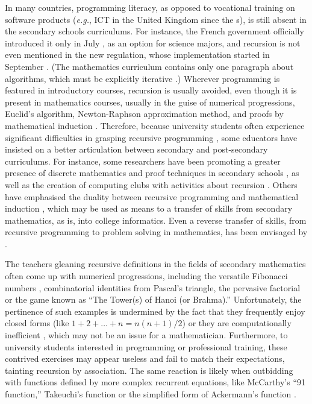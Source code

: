 \documentclass[11pt,a4paper]{article}
\begin{document}
In many countries, programming literacy, as opposed to vocational
training on software products (\emph{e.g.}, ICT in the United Kingdom
since the s), is still absent in the secondary
schools curriculums. For instance, the French government officially
introduced it only in July , as an option for
science majors, and recursion is not even mentioned in the new
regulation, whose implementation started in September
. (The mathematics curriculum contains only one
paragraph about algorithms, which must be explicitly iterative
\citep{Modeste:2012}.) Wherever programming is featured in
introductory courses, recursion is usually avoided, even though it is
present in mathematics courses, usually in the guise of numerical
progressions, Euclid's algorithm, Newton\hyp{}Raphson approximation
method, and proofs by mathematical induction
\citep{Buck:1963}. Therefore, because university students often
experience significant difficulties in grasping recursive programming
\citep{Sooriamurthi:2001,Ginat:2004}, some educators have insisted on
a better articulation between secondary and post\hyp{}secondary
curriculums. For instance, some researchers have been promoting a
greater presence of discrete mathematics and proof techniques in
secondary schools
\citep{AbramovichPieper:1996,daRosa:2002,RosensteinFranzblauRoberts:1997,ZDM:A,ZDM:B},
as well as the creation of computing clubs with activities about
recursion \citep{GunionMilfordStege:2009a}. Others have emphasised the
duality between recursive programming and mathematical induction
\citep{Peelle:1976,Ford:1984,LeronZazkis:1986,Anderson:1992,BrandtRichey:2004,Polycarpou:2006},
which may be used as means to a transfer of skills from secondary
mathematics, as is, into college informatics. Even a reverse transfer
of skills, from recursive programming to problem solving in
mathematics, has been envisaged by \textcite{Hausmann:1985}.

The teachers gleaning recursive definitions in the fields of secondary
mathematics often come up with numerical progressions, including the
versatile Fibonacci numbers
\citep{RubioPajak:2006,RubioHernan:2007,Rubio:2008}, combinatorial
identities from Pascal's triangle, the pervasive factorial or the game
known as ``The Tower(s) of Hanoi (or Brahma).\@''
\citep{BunemanLevy:1980,Anderson:1992,BenanderBenander:2008}
Unfortunately, the pertinence of such examples is undermined by the
fact that they frequently enjoy closed forms (like \(1 + 2 + \dots + n
= n(n+1)/2\)) or they are computationally inefficient
\citep{Er:1984,Knight:1988,Costello:1990,Robertson:1999,Stojmenovic:2000,Manolopoulos:2005},
which may not be an issue for a mathematician. Furthermore, to
university students interested in programming or professional
training, these contrived exercises may appear useless and fail to
match their expectations, tainting recursion by association. The same
reaction is likely when outbidding with functions defined by more
complex recurrent equations, like McCarthy's ``91 function,''
Takeuchi's function \citep{Knuth:2000} or the simplified form of
Ackermann's function \citep{Robinson:1947,Robinson:1948}.
\end{document}
